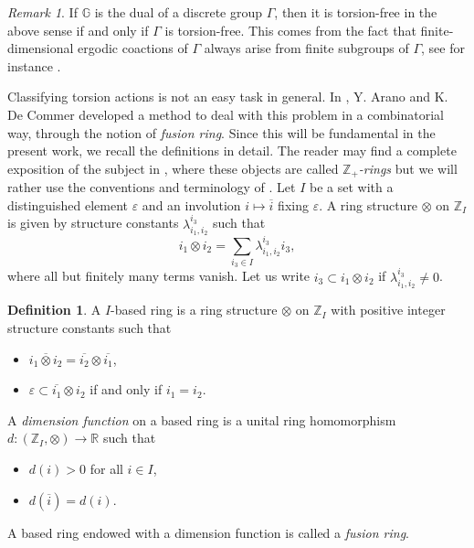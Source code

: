 \documentclass[a4paper, 11pt]{amsart}
\theoremstyle{plain}
\theoremstyle{definition}
\newtheorem{de}[thm]{Definition}
\theoremstyle{remark}
\newtheorem{rem}[thm]{Remark}
\newcommand{\G}{\mathbb{G}}
\newcommand{\R}{\mathbb{R}}
\newcommand{\Z}{\mathbb{Z}}
\begin{document}
\begin{rem}
If $\G$ is the dual of a discrete group $\Gamma$, then it is torsion-free in the above sense if and only if $\Gamma$ is torsion-free. This comes from the fact that finite-dimensional ergodic coactions of $\Gamma$ always arise from finite subgroups of $\Gamma$, see for instance \cite[Prop 4.2]{voigt2015structure}.
\end{rem}

Classifying torsion actions is not an easy task in general. In \cite{arano2015torsion}, Y. Arano and K. De Commer developed a method to deal with this problem in a combinatorial way, through the notion of \emph{fusion ring}. Since this will be fundamental in the present work, we recall the definitions in detail. The reader may find a complete exposition of the subject in \cite[Chap 3]{etingof2015tensor}, where these objects are called \emph{$\Z_{+}$-rings} but we will rather use the conventions and terminology of \cite{arano2015torsion}. Let $I$ be a set with a distinguished element $\varepsilon$ and an involution $i\mapsto \overline{i}$ fixing $\varepsilon$. A ring structure $\otimes$ on $\Z_{I}$ is given by structure constants $\lambda_{i_{1}, i_{2}}^{i_{3}}$ such that
\begin{equation*}
i_{1}\otimes i_{2} = \sum_{i_{3}\in I}\lambda_{i_{1}, i_{2}}^{i_{3}}i_{3},
\end{equation*}
where all but finitely many terms vanish. Let us write $i_{3}\subset i_{1}\otimes i_{2}$ if $\lambda_{i_{1}, i_{2}}^{i_{3}}\neq 0$.

\begin{de}
A $I$-based ring is a ring structure $\otimes$ on $\Z_{I}$ with positive integer structure constants such that
\begin{itemize}
\item $\overline{i_{1}\otimes i_{2}} = \overline{i_{2}}\otimes \overline{i_{1}}$,
\item $\varepsilon\subset \overline{i_{1}}\otimes i_{2}$ if and only if $i_{1} = i_{2}$.
\end{itemize}
A \emph{dimension function} on a based ring is a unital ring homomorphism $d : (\Z_{I}, \otimes)\rightarrow \R$ such that
\begin{itemize}
\item $d(i) > 0$ for all $i\in I$,
\item $d(\overline{i}) = d(i)$.
\end{itemize}
A based ring endowed with a dimension function is called a \emph{fusion ring}.
\end{de}
\end{document}

